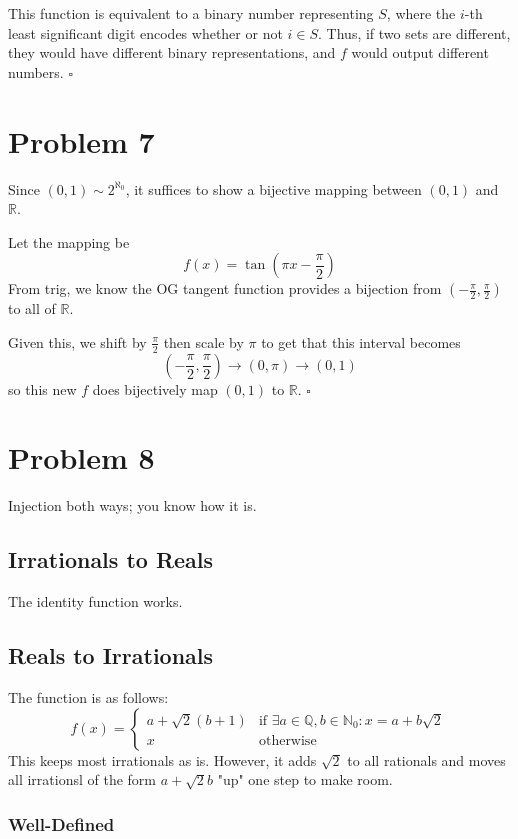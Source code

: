 \documentclass[12pt]{article}
\newcommand{\N}{\mathbb{N}}
\newcommand{\R}{\mathbb{R}}
\newcommand{\Q}{\mathbb{Q}}
\begin{document}
This function is equivalent to a binary number representing $S$,
where the $i$-th least significant digit encodes whether or not $i \in S$.
Thus, if two sets are different, they would have different binary representations,
and $f$ would output different numbers. $\square$

\section{Problem 7}

Since $(0, 1) \sim 2^{\aleph_0}$, it suffices to show
a bijective mapping between $(0, 1)$ and $\R$.

Let the mapping be
\[f(x)=\tan\left(\pi x - \frac{\pi}{2}\right)\]
From trig, we know the OG tangent function provides a bijection from
$\left(-\frac{\pi}{2}, \frac{\pi}{2}\right)$ to all of $\R$.

Given this, we shift by $\frac{\pi}{2}$ then scale by $\pi$ to get that
this interval becomes
\[\left(-\frac{\pi}{2}, \frac{\pi}{2}\right) \to (0, \pi) \to \left(0, 1\right)\]
so this new $f$ does bijectively map $(0, 1)$ to $\R$. $\square$

\pagebreak

\section{Problem 8}

Injection both ways; you know how it is.

\subsection{Irrationals to Reals}

The identity function works.

\subsection{Reals to Irrationals}

The function is as follows:
\[f(x)=\begin{cases}
    a+\sqrt{2}(b+1) & \text{if $\exists a \in \Q, b \in \N_0: x=a+b\sqrt{2}$} \\
    x               & \text{otherwise}
  \end{cases}\]
This keeps most irrationals as is.
However, it adds $\sqrt{2}$ to all rationals and moves
all irrationsl of the form $a+\sqrt{2}b$ "up" one step to make room.

\subsubsection{Well-Defined}
\end{document}
